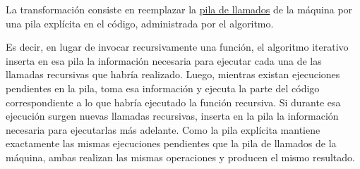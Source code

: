 La transformación consiste en reemplazar la \hyperref[sec:pila_de_llamados]{pila de llamados} de la máquina por una pila explícita en el código, administrada por el algoritmo. 

Es decir, en lugar de invocar recursivamente una función, el algoritmo iterativo inserta en esa pila la información necesaria para ejecutar cada una de las llamadas recursivas que habría realizado. Luego, mientras existan ejecuciones pendientes en la pila, toma esa información y ejecuta la parte del código correspondiente a lo que habría ejecutado la función recursiva. Si durante esa ejecución surgen nuevas llamadas recursivas, inserta en la pila la información necesaria para ejecutarlas más adelante. Como la pila explícita mantiene exactamente las mismas ejecuciones pendientes que la pila de llamados de la máquina, ambas realizan las mismas operaciones y producen el mismo resultado.

